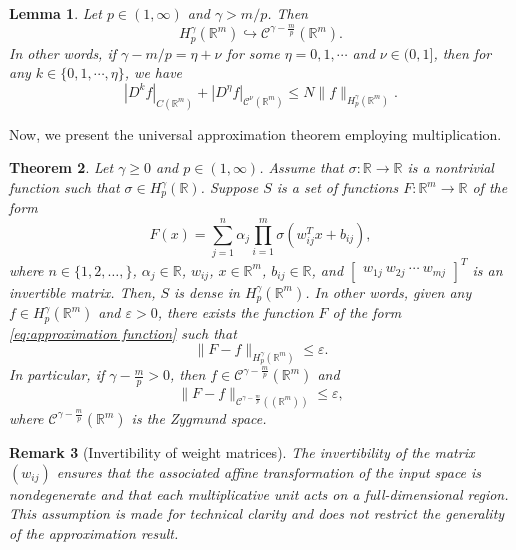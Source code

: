 \documentclass[11pt,reqno]{amsart}
\numberwithin{equation}{section}
\newtheorem{theorem}{Theorem}[section]
\newtheorem{lemma}[theorem]{Lemma}
\newtheorem{remark}[theorem]{\bf{Remark}}
\theoremstyle{remark}
\theoremstyle{definition}
\newcommand\bR{\mathbb{R}}
\newcommand\cC{\mathcal{C}}
\newcommand\ep{\varepsilon}
\begin{document}
\begin{lemma}
\label{embedding lemma}
Let $p\in (1,\infty)$ and $\gamma>m/p$. Then 
\begin{equation*}
H_p^\gamma(\mathbb{R}^m) \hookrightarrow \cC^{\gamma - \frac{m}{p}}(\mathbb{R}^m).
\end{equation*}
In other words, if $\gamma - m/p = \eta+\nu$ for some $\eta=0,1,\cdots$ and $\nu\in(0,1]$, then for any  $k\in\{ 0,1,\cdots,\eta \}$, we have
\begin{equation*} 
| D^k f |_{C(\bR^{m})} + | D^\eta f |_{\cC^\nu(\bR^{m})} \leq N \| f \|_{H_{p}^\gamma(\bR^{m})}.
\end{equation*}

\end{lemma}

Now, we present the universal approximation theorem employing multiplication.

\begin{theorem}
\label{main theorem}
Let $\gamma\geq0$ and $p\in (1,\infty)$. Assume that $\sigma:\bR \to \bR$ is a nontrivial function such that $\sigma\in H_{p}^{\gamma}(\bR)$. Suppose $S$ is a set of functions $F:\bR^{m}\to \bR$ of the form
\begin{equation}
\label{eq:approximation function}
F(x) = \sum_{j = 1}^{n}\alpha_{j} \prod_{i = 1}^{m}\sigma\left( w^{T}_{ij} x + b_{ij} \right),
\end{equation}
where 
$n\in \{1,2,\dots,\}$, $\alpha_{j}\in\bR$,  $w_{ij}$, $x\in \bR^{m}$, $b_{ij}\in \bR$, and $
\begin{bmatrix}
w_{1j}~w_{2j}~\cdots~w_{mj}
\end{bmatrix}^{T}$
is an invertible matrix. Then, $S$ is dense in $H_p^{\gamma}(\bR^{m})$. In other words, given any $f\in H^{\gamma}_p(\bR^{m})$ and $\ep>0$, there exists the function $F$ of the form \eqref{eq:approximation function} such that
\begin{equation*}
\| F - f \|_{H_p^{\gamma}(\bR^{m})} \leq \ep.
\end{equation*}
In particular, if $\gamma - \frac{m}{p} >0 $, then $f\in \cC^{\gamma-\frac{m}{p}}(\bR^{m})$ and
\begin{equation*}
\| F - f \|_{\cC^{\gamma-\frac{m}{p}}((\bR^{m}))} \leq \ep,
\end{equation*}
where $\cC^{\gamma-\frac{m}{p}}(\bR^{m})$ is the Zygmund space.
\end{theorem}

\begin{remark}[Invertibility of weight matrices]
The invertibility of the matrix $(w_{ij})$ ensures that the associated affine transformation
of the input space is nondegenerate and that each multiplicative unit acts on a full-dimensional
region. This assumption is made for technical clarity and does not restrict the generality
of the approximation result.
\end{remark}
\end{document}
